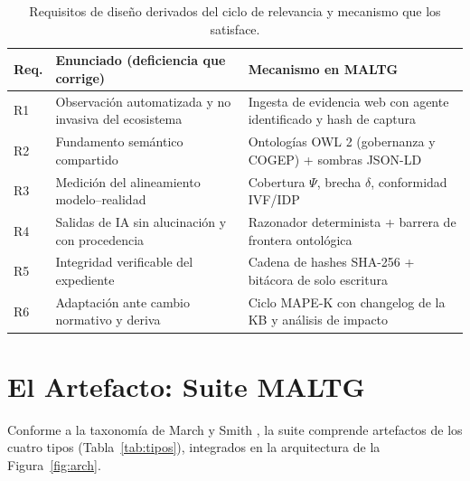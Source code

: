 \documentclass[computers,article,submit,pdftex,moreauthors]{Definitions/mdpi}
\begin{document}
\begin{table}[H]
\caption{Requisitos de diseño derivados del ciclo de relevancia y mecanismo que los satisface.}
\label{tab:reqs}
\begin{tabularx}{\textwidth}{lXX}
\toprule
\textbf{Req.} & \textbf{Enunciado (deficiencia que corrige)} & \textbf{Mecanismo en MALTG}\\
\midrule
R1 & Observación automatizada y no invasiva del ecosistema \cite{Rosa2013} & Ingesta de evidencia web con agente identificado y hash de captura\\
R2 & Fundamento semántico compartido \cite{Karabulut2024,Casanovas2016} & Ontologías OWL 2 (gobernanza y COGEP) + sombras JSON-LD\\
R3 & Medición del alineamiento modelo--realidad \cite{Karabulut2024} & Cobertura $\Psi$, brecha $\delta$, conformidad IVF/IDP\\
R4 & Salidas de IA sin alucinación y con procedencia \cite{Dahl2024,Rudin2019} & Razonador determinista + barrera de frontera ontológica\\
R5 & Integridad verificable del expediente \cite{Haber1991,Olnes2017} & Cadena de hashes SHA-256 + bitácora de solo escritura\\
R6 & Adaptación ante cambio normativo y deriva \cite{Kephart2003} & Ciclo MAPE-K con changelog de la KB y análisis de impacto\\
\bottomrule
\end{tabularx}
\end{table}

\section{El Artefacto: Suite MALTG}
\label{sec:artefacto}

Conforme a la taxonomía de March y Smith \cite{March1995}, la suite comprende artefactos de los cuatro tipos (Tabla~\ref{tab:tipos}), integrados en la arquitectura de la Figura~\ref{fig:arch}.
\end{document}
